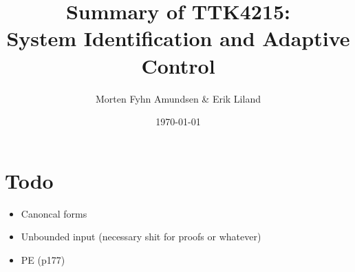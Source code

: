 \documentclass[a4paper,12pt]{article}
\title{Summary of TTK4215:\\System Identification and Adaptive Control}
\author{Morten Fyhn Amundsen \& Erik Liland}
\date{\today}
\begin{document}
\maketitle
\tableofcontents

\section{Todo}
\begin{itemize}
	\item Canoncal forms
	\item Unbounded input (necessary shit for proofs or whatever)
	\item PE (p177)
\end{itemize}







\end{document}
